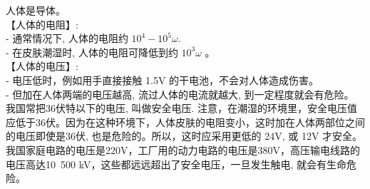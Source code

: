 \documentclass[UTF8]{ctexart}
\begin{document}
人体是导体。 \\

【人体的电阻】:\\
- 通常情况下, 人体的电阻约 $10^4 - 10^5 \omega$. \\
- 在皮肤潮湿时, 人体的电阻可降低到约  $10^3 \omega$ 。 \\


【人体的电压】:\\
- 电压低时，例如用手直接接触 1.5V 的干电池，不会对人体造成伤害。 \\
- 但加在人体两端的电压越高, 流过人体的电流就越大, 到一定程度就会有危险。 我国常把36伏特以下的电压, 叫做安全电压. 注意，在潮湿的环境里，安全电压值应低于36伏。因为在这种环境下，人体皮肤的电阻变小，这时加在人体两部位之间的电压即使是36伏, 也是危险的。所以，这时应采用更低的 24V, 或 12V 才安全。\\

我国家庭电路的电压是220V，工厂用的动力电路的电压是380V，高压输电线路的电压高达10~500 kV，这些都远远超出了安全电压，一旦发生触电, 就会有生命危险。 \\
\end{document}
